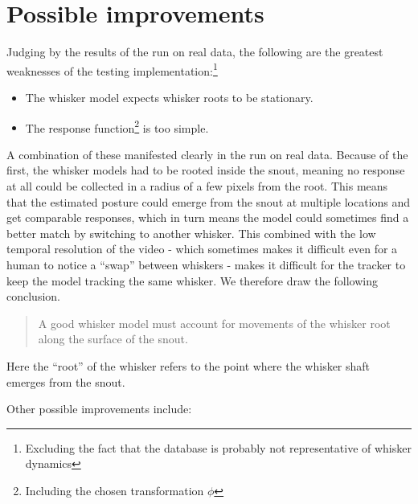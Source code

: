 


\section{Possible improvements}

Judging by the results of the run on real data, the following are the
greatest weaknesses of the testing implementation:\footnote{Excluding
  the fact that the database is probably not representative of whisker
  dynamics}

\begin{itemize}
\item The whisker model expects whisker roots to be stationary.
\item The response function\footnote{Including the chosen
    transformation $\phi$} is too simple.
\end{itemize}

A combination of these manifested clearly in the run on real
data. Because of the first, the whisker models had to be rooted inside
the snout, meaning no response at all could be collected in a radius
of a few pixels from the root. This means that the estimated posture
could emerge from the snout at multiple locations and get comparable
responses, which in turn means the model could sometimes find a better
match by switching to another whisker. This combined with the low
temporal resolution of the video - which sometimes makes it difficult
even for a human to notice a ``swap'' between whiskers - makes it
difficult for the tracker to keep the model tracking the same
whisker. We therefore draw the following conclusion.

\begin{quote}
  A good whisker model must account for movements of the whisker root
  along the surface of the snout.
\end{quote}

Here the ``root'' of the whisker refers to the point where the whisker
shaft emerges from the snout.

Other possible improvements include:

